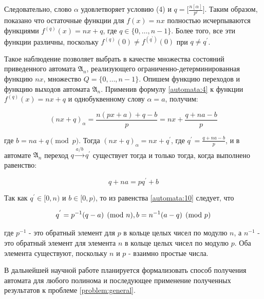 \documentclass[och, master]{SCWorks}
\theoremstyle{plain}
\theoremstyle{plain}
\theoremstyle{plain}
\theoremstyle{definition}
\begin{document}
\noindent Следовательно, слово $\alpha$ удовлетворяет условию (4) и $q=\bigg[\frac{n[\alpha]}{p^l}\bigg]$. Таким образом, показано что остаточные функции для $f(x)=nx$ полностью исчерпываются функциями $f^{(q)}(x)=nx+q$, где $q \in \{0, \ldots, n-1 \}$. Более того, все эти функции различны, поскольку $f^{(q)}(0) \neq f^{(q^{'})}(0)$ при $q \neq q^{'}$.

Такое наблюдение позволяет выбрать в качестве множества состояний приведенного автомата $\mathfrak{A}_n$, реализующего ограниченно-детерминированная функцию $nx$, множество $Q=\{0, \ldots, n-1 \}$. Опишем функцию переходов и функцию выходов автомата $\mathfrak{A}_n$. Применив формулу \ref{automata:4} к функции $f^{(q)}(x)=nx+q$ и однобуквенному слову $\alpha=a$, получим:


 \begin{equation} \label{automata:9}
 (nx+q)_{\alpha}=\frac{n(px+a)+q-b}{p}=nx+\frac{q+na-b}{p}	
 \end{equation}
 
\noindent где $b=na+q \pmod p$. Тогда $(nx+q)_\alpha = nx + q^{'}$, где $q^{'}=\frac{q+na-b}{p}$, и в автомате $\mathfrak{A}_n$ переход $q \xrightarrow{a/b} q^{'}$ существует тогда и только тогда, когда выполнено равенство:
 
 \begin{equation} \label{automata:10}
 	q+na=pq^{'}+b
 \end{equation}

\noindent Так как $q^{'} \in [0, n)$ и $b \in [0,p)$, то из равенства \ref{automata:10} следует, что

\begin{equation}
q^{'}=p^{-1}(q-a) \pmod n, \\
b=n^{-1}(a-q) \pmod p	
\end{equation}

\noindent где $p^{-1}$ - это обратный элемент для $p$ в кольце целых чисел по модулю $n$, а $n^{-1}$ - это обратный элемент для элемента $n$ в кольце целых чисел по модулю $p$. Оба элемента существуют, поскольку $n$ и $p$ - взаимно простые числа.


\conclusion
В дальнейшей научной работе планируется формализовать способ получения автомата для любого полинома и последующее применение полученных результатов к проблеме \ref{problem:general}.




\end{document}
